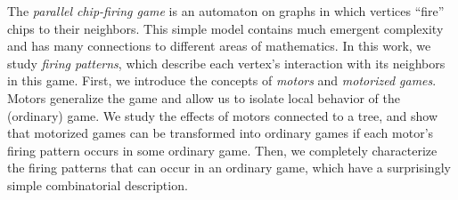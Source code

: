 The \emph{parallel chip-firing game} is an automaton on graphs in which
vertices ``fire'' chips to their neighbors. This simple model contains much
emergent complexity and has many connections to different areas of
mathematics. In this work, we study \emph{firing patterns}, which
describe each vertex's interaction with its neighbors in this game. First, we
introduce the concepts of \emph{motors} and \emph{motorized games}. Motors
generalize the game and allow us to isolate local behavior of the
(ordinary) game. We study the effects of motors connected to a tree, and show
that motorized games can be transformed into ordinary games if each motor's
firing pattern occurs in some ordinary game. Then, we completely characterize
the firing patterns that can occur in an ordinary game, which have a
surprisingly simple combinatorial description.

